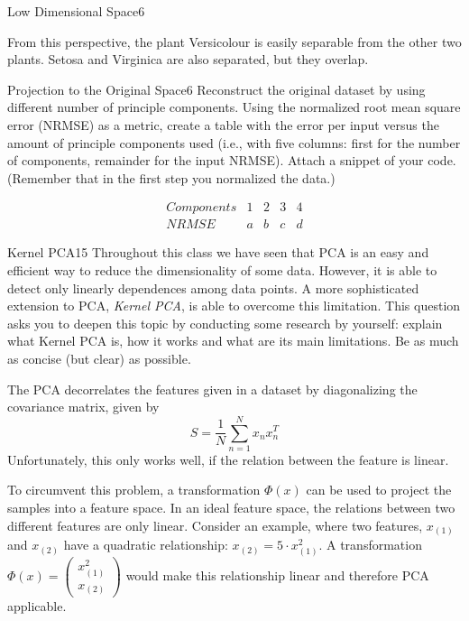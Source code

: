 \begin{questions}
\begin{question}{Low Dimensional Space}{6}
\begin{answer}
From this perspective, the plant Versicolour is easily separable from the other two plants. Setosa and Virginica are also separated, but they overlap.

\end{answer}

\end{question}


\begin{question}{Projection to the Original Space}{6}
Reconstruct the original dataset by using different number of principle components. Using the normalized root mean square error (NRMSE) as a metric, create a table with the error per input versus the amount of principle components used (i.e., with five columns: first for the number of components, remainder for the input NRMSE).
Attach a snippet of your code.
(Remember that in the first step you normalized the data.)


\begin{answer}


\[\begin{array}{lcccc}
	Components & 1 & 2 & 3 & 4 \\ 
	NRMSE & a & b & c & d
\end{array} 
\]
	
\end{answer}
\end{question}

\begin{question}[bonus]{Kernel PCA}{15}
Throughout this class we have seen that PCA is an easy and efficient way to reduce the dimensionality of some data. However, it is able to detect only linearly dependences among data points. A more sophisticated extension to PCA, \emph{Kernel PCA}, is able to overcome this limitation. 
This question asks you to deepen this topic by conducting some research by yourself: explain what Kernel PCA is, how it works and what are its main limitations. Be as much as concise (but clear) as possible.

\begin{answer}
The PCA decorrelates the features given in a dataset by diagonalizing the covariance matrix, given by 
\[S = \frac{1}{N} \sum_{n=1}^{N}x_n x_n^T\]
Unfortunately, this only works well, if the relation between the feature is linear.

To circumvent this problem, a transformation $\Phi (x)$ can be used to project the samples into a feature space. In an ideal feature space, the relations between two different features are only linear. Consider an example, where two features, $x_{(1)}$ and $x_{(2)}$ have a quadratic relationship: $x_{(2)} = 5 \cdot x_{(1)}^2$. A transformation $\Phi(x) = (\begin{matrix}
x_{(1)}^2\\
x_{(2)}
\end{matrix}) $ would make this relationship linear and therefore PCA applicable.


\end{answer}
\end{question}
\end{questions}
